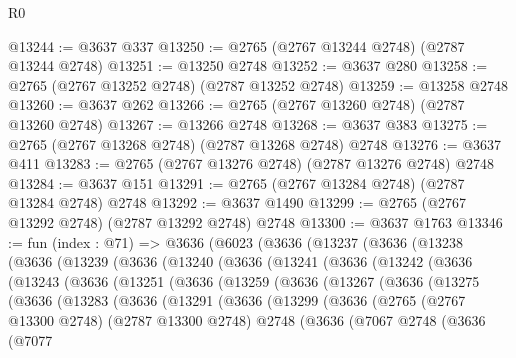 \begin{lexlean}{R0}
\begin{coremodule}
@13244 := @3637 @337
@13250 := @2765 (@2767 @13244 @2748) (@2787 @13244 @2748)
@13251 := @13250 @2748
@13252 := @3637 @280
@13258 := @2765 (@2767 @13252 @2748) (@2787 @13252 @2748)
@13259 := @13258 @2748
@13260 := @3637 @262
@13266 := @2765 (@2767 @13260 @2748) (@2787 @13260 @2748)
@13267 := @13266 @2748
@13268 := @3637 @383
@13275 := @2765 (@2767 @13268 @2748) (@2787 @13268 @2748) @2748
@13276 := @3637 @411
@13283 := @2765 (@2767 @13276 @2748) (@2787 @13276 @2748) @2748
@13284 := @3637 @151
@13291 := @2765 (@2767 @13284 @2748) (@2787 @13284 @2748) @2748
@13292 := @3637 @1490
@13299 := @2765 (@2767 @13292 @2748) (@2787 @13292 @2748) @2748
@13300 := @3637 @1763
@13346 := fun (index : @71) =>
  @3636
    (@6023
      (@3636
        (@13237
          (@3636
            (@13238
              (@3636
                (@13239
                  (@3636
                    (@13240
                      (@3636
                        (@13241
                          (@3636
                            (@13242
                              (@3636
                                (@13243
                                  (@3636
                                    (@13251
                                      (@3636
                                        (@13259
                                          (@3636
                                            (@13267
                                              (@3636
                                                (@13275
                                                  (@3636
                                                    (@13283
                                                      (@3636
                                                        (@13291
                                                          (@3636
                                                            (@13299
                                                              (@3636
                                                                (@2765
                                                                  (@2767 @13300 @2748)
                                                                  (@2787 @13300 @2748)
                                                                  @2748
                                                                  (@3636
                                                                    (@7067
                                                                      @2748
                                                                      (@3636
                                                                        (@7077

\end{coremodule}
\end{lexlean}
